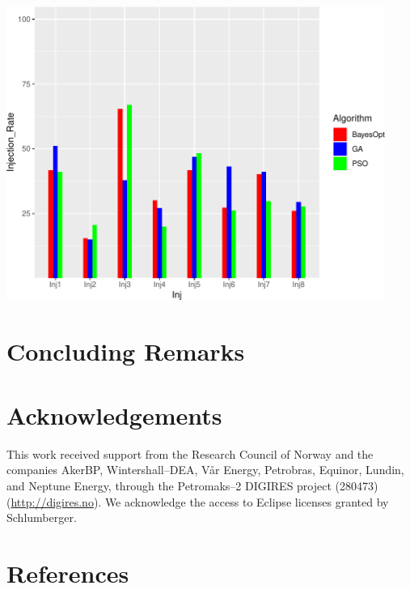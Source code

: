 \documentclass[]{elsarticle} %
\begin{document}
\begin{center}\includegraphics[width=468px]{0_Paper1_main_files/figure-latex/unnamed-chunk-10-1} \end{center}

\newpage

\hypertarget{concluding-remarks}{%
\section{Concluding Remarks}\label{concluding-remarks}}

\newpage

\hypertarget{acknowledgements}{%
\section{Acknowledgements}\label{acknowledgements}}

This work received support from the Research Council of Norway and the companies AkerBP, Wintershall--DEA, Vår Energy, Petrobras, Equinor, Lundin, and Neptune Energy, through the Petromaks--2 DIGIRES project (280473) (\url{http://digires.no}). We acknowledge the access to Eclipse licenses granted by Schlumberger.

\newpage

\hypertarget{references}{%
\section*{References}\label{references}}
\end{document}
